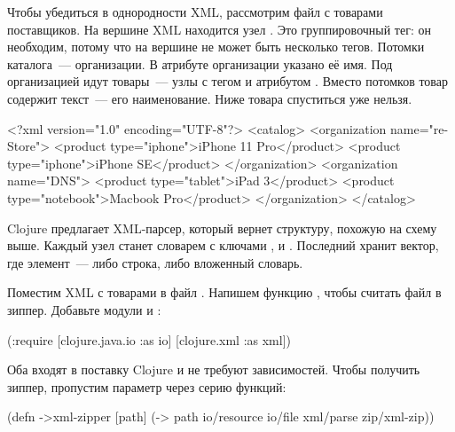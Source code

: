 Чтобы убедиться в однородности XML, рассмотрим файл с товарами поставщиков. На
вершине XML находится узел . Это группировочный тег: он необходим,
потому что на вершине не может быть несколько тегов. Потомки каталога~---
организации. В атрибуте  организации указано её имя. Под организацией
идут товары~--- узлы с тегом  и атрибутом . Вместо
потомков товар содержит текст~--- его наименование. Ниже товара спуститься уже
нельзя.

\begin{english}
  \begin{xml}
<?xml version="1.0" encoding="UTF-8"?>
<catalog>
  <organization name="re-Store">
    <product type="iphone">iPhone 11 Pro</product>
    <product type="iphone">iPhone SE</product>
  </organization>
  <organization name="DNS">
    <product type="tablet">iPad 3</product>
    <product type="notebook">Macbook Pro</product>
  </organization>
</catalog>
  \end{xml}
\end{english}

Clojure предлагает XML-парсер, который вернет структуру, похожую на схему
 выше. Каждый узел станет словарем с ключами
,  и . Последний хранит вектор, где
элемент~--- либо строка, либо вложенный словарь.

Поместим XML с товарами в файл . Напишем функцию
, чтобы считать файл в зиппер. Добавьте модули  и
:

\begin{english}
  \begin{clojure}
(:require
 [clojure.java.io :as io]
 [clojure.xml :as xml])
  \end{clojure}
\end{english}

Оба входят в поставку Clojure и не требуют зависимостей. Чтобы получить зиппер,
пропустим параметр  через серию функций:


\begin{english}
  \begin{clojure}
(defn ->xml-zipper [path]
  (-> path
      io/resource
      io/file
      xml/parse
      zip/xml-zip))
  \end{clojure}
\end{english}

